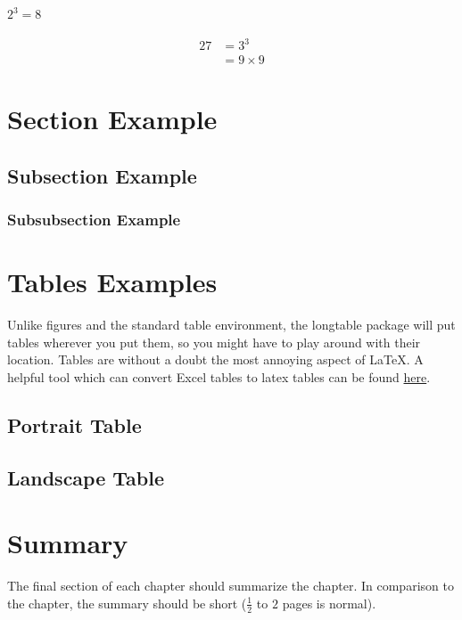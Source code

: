     \begin{math}
        2^3=8
    \end{math}
    
    \begin{align}
        27 &= 3^3 \\
        &= 9 \times 9
    \end{align}
\section{Section Example}\label{sec:section_Example}
\subsection{Subsection Example}
\subsubsection{Subsubsection Example}
    
    
\section{Tables Examples}
Unlike figures and the standard table environment, the longtable package will put tables wherever you put them, so you might have to play around with their location. Tables are without a doubt the most annoying aspect of \LaTeX. A helpful tool which can convert Excel tables to latex tables can be found \href{https://github.com/krlmlr/Excel2LaTeX}{here}.

\newpage %
\subsection{Portrait Table}

\subsection{Landscape Table}

\section{Summary}
\label{s:Background-Summary}

The final section of each chapter should summarize the chapter. In comparison to the chapter, the summary should be short ($\frac{1}{2}$ to $2$ pages is normal).

